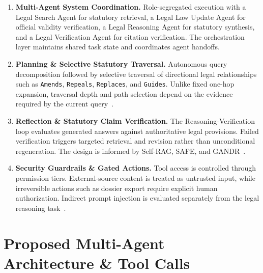 \begin{enumerate}
    \item \textbf{Multi-Agent System Coordination.}
    Role-segregated execution with a Legal Search Agent for statutory retrieval, a Legal Law Update Agent for official validity verification, a Legal Reasoning Agent for statutory synthesis, and a Legal Verification Agent for citation verification. The orchestration layer maintains shared task state and coordinates agent handoffs.

    \item \textbf{Planning \& Selective Statutory Traversal.}
    Autonomous query decomposition followed by selective traversal of directional legal relationships such as \texttt{Amends}, \texttt{Repeals}, \texttt{Replaces}, and \texttt{Guides}. Unlike fixed one-hop expansion, traversal depth and path selection depend on the evidence required by the current query~\cite{phan2026sbvlawgraph}.

    \item \textbf{Reflection \& Statutory Claim Verification.}
    The Reasoning-Verification loop evaluates generated answers against authoritative legal provisions. Failed verification triggers targeted retrieval and revision rather than unconditional regeneration. The design is informed by Self-RAG, SAFE, and GANDR~\cite{asai2024selfrag,wei2024safe,qian2026gandr}.

    \item \textbf{Security Guardrails \& Gated Actions.}
    Tool access is controlled through permission tiers. External-source content is treated as untrusted input, while irreversible actions such as dossier export require explicit human authorization. Indirect prompt injection is evaluated separately from the legal reasoning task~\cite{debenedetti2024injection}.
\end{enumerate}

\section{Proposed Multi-Agent Architecture \& Tool Calls}

